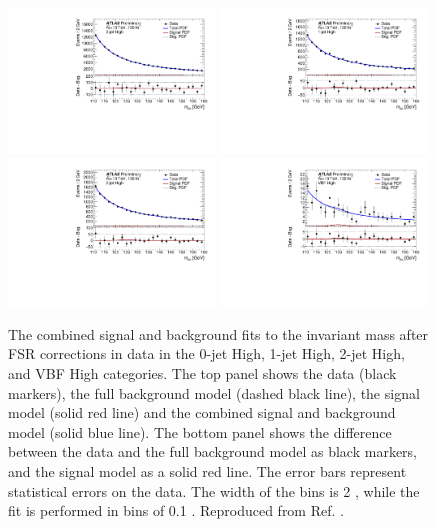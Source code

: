 \begin{figure}[h!]
  \centering
  \includegraphics[width=0.49\textwidth]{figures/hmumu/fits/BDT10}
  \includegraphics[width=0.49\textwidth]{figures/hmumu/fits/BDT7}
  \includegraphics[width=0.49\textwidth]{figures/hmumu/fits/BDT4}
  \includegraphics[width=0.49\textwidth]{figures/hmumu/fits/BDT1}
  \caption[Combined signal and background fit to data for High categories]{
  The combined signal and background fits to the invariant mass after FSR
  corrections in data in the 0-jet High, 1-jet High, 2-jet High,
  and VBF High categories. The top panel shows the data (black
  markers), the full background model (dashed black line), the signal
  model (solid red line) and the combined signal and background model
  (solid blue line). The bottom panel shows the difference between the data
  and the full background model as black markers, and the signal model
  as a solid red line. The error bars represent statistical errors on
  the data. The width of the bins is 2 \GeV, while the fit is
  performed in bins of 0.1 \GeV.
  Reproduced from Ref. \cite{ATLAS-CONF-2019-028}.
  }
  \label{fig:hmumu:fit-high}
\end{figure}



